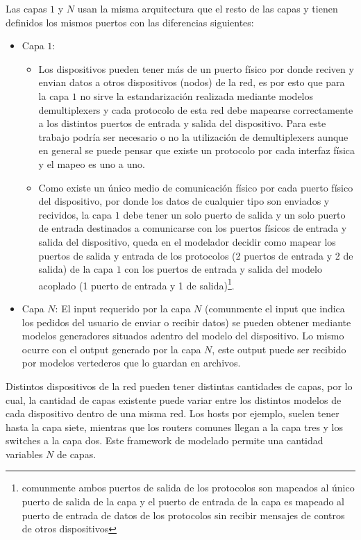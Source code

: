 \documentclass[10pt,a4paper]{article}
\begin{document}
Las capas $1$ y $N$ usan la misma arquitectura que el resto de las capas y tienen definidos los mismos puertos con las diferencias siguientes:
\begin{itemize}
\item Capa $1$:
\begin{itemize}
\item Los dispositivos pueden tener más de un puerto físico por donde reciven y envian datos a otros dispositivos (nodos) de la red, es por esto que para la capa $1$ no sirve la estandarización realizada mediante modelos demultiplexers y cada protocolo de esta red debe mapearse correctamente a los distintos puertos de entrada y salida del dispositivo. Para este trabajo podría ser necesario o no la utilización de demultiplexers aunque en general se puede pensar que existe un protocolo por cada interfaz física y el mapeo es uno a uno.
\item Como existe un único medio de comunicación físico por cada puerto físico del dispositivo, por donde los datos de cualquier tipo son enviados y recividos, la capa $1$ debe tener un solo puerto de salida y un solo puerto de entrada destinados a comunicarse con los puertos físicos de entrada y salida del dispositivo, queda en el modelador decidir como mapear los puertos de salida y entrada de los protocolos (2 puertos de entrada y 2 de salida) de la capa $1$ con los puertos de entrada y salida del modelo acoplado (1 puerto de entrada y 1 de salida)\footnote{comunmente  ambos puertos de salida de los protocolos son mapeados al único puerto de salida de la capa y el puerto de entrada de la capa es mapeado al puerto de entrada de datos de los protocolos sin recibir mensajes de contros de otros dispositivos}.
\end{itemize}
\item Capa $N$: El input requerido por la capa $N$ (comunmente el input que indica los pedidos del usuario de enviar o recibir datos) se pueden obtener mediante modelos generadores situados adentro del modelo del dispositivo. Lo mismo ocurre con el output generado por la capa $N$, este output puede ser recibido por modelos vertederos que lo guardan en archivos.
\end{itemize}

Distintos dispositivos de la red pueden tener distintas cantidades de capas, por lo cual, la cantidad de capas existente puede variar entre los distintos modelos de cada dispositivo dentro de una misma red. Los hosts por ejemplo, suelen tener hasta la capa siete, mientras que los routers comunes llegan a la capa tres y los switches a la capa dos. Este framework de modelado permite una cantidad variables $N$ de capas. \\
\end{document}
